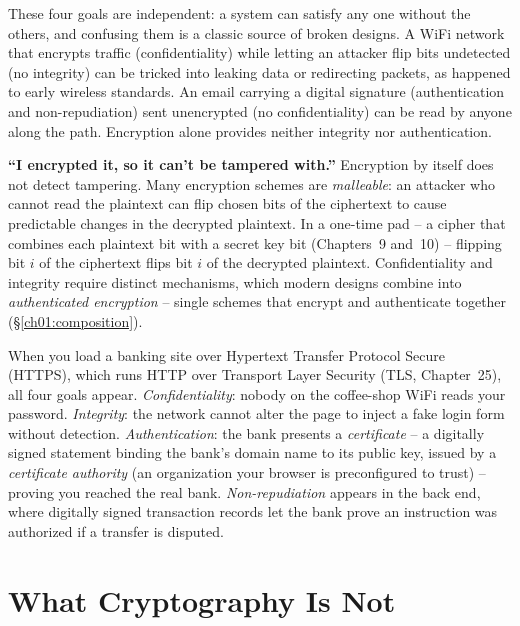 These four goals are independent: a system can satisfy any one without the others, and confusing them is a classic source of broken designs. A WiFi network that encrypts traffic (confidentiality) while letting an attacker flip bits undetected (no integrity) can be tricked into leaking data or redirecting packets, as happened to early wireless standards. An email carrying a digital signature (authentication and non-repudiation) sent unencrypted (no confidentiality) can be read by anyone along the path. Encryption alone provides neither integrity nor authentication.

\begin{trapbox}
\textbf{``I encrypted it, so it can't be tampered with.''} Encryption by itself does not detect tampering. Many encryption schemes are \emph{malleable}: an attacker who cannot read the plaintext can flip chosen bits of the ciphertext to cause predictable changes in the decrypted plaintext. In a one-time pad -- a cipher that combines each plaintext bit with a secret key bit (Chapters~9 and~10) -- flipping bit $i$ of the ciphertext flips bit $i$ of the decrypted plaintext. Confidentiality and integrity require distinct mechanisms, which modern designs combine into \emph{authenticated encryption} -- single schemes that encrypt and authenticate together (\S\ref{ch01:composition}).
\end{trapbox}

\begin{applicationbox}
When you load a banking site over Hypertext Transfer Protocol Secure (HTTPS), which runs HTTP over Transport Layer Security (TLS, Chapter~25), all four goals appear. \emph{Confidentiality}: nobody on the coffee-shop WiFi reads your password. \emph{Integrity}: the network cannot alter the page to inject a fake login form without detection. \emph{Authentication}: the bank presents a \emph{certificate} -- a digitally signed statement binding the bank's domain name to its public key, issued by a \emph{certificate authority} (an organization your browser is preconfigured to trust) -- proving you reached the real bank. \emph{Non-repudiation} appears in the back end, where digitally signed transaction records let the bank prove an instruction was authorized if a transfer is disputed.
\end{applicationbox}

\section{What Cryptography Is Not}
\label{ch01:what-its-not}

